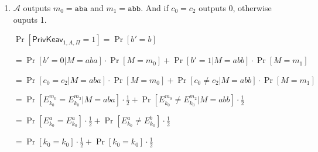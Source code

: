 \begin{enumerate}
    $= 1 \cdot \frac{1}{2} + 1 \cdot \frac{1}{2} = 1$
    
    $\Pr[\mathsf{PrivKeav}_{2,A,\Pi}=1] = \Pr[b' = b]$
    
    $= \Pr[E_{k_0}^{a}  = E_{k_1}^{a}] \cdot \frac{1}{2} + \Pr[E_{k_0}^{a} \ne E_{k_1}^{b}] \cdot \frac{1}{2}$
    
    $= \Pr[k_0  = k_1] \cdot \frac{1}{2} + \Pr[(k_1 + 1) \mod 26 \ne k_0 ] \cdot \frac{1}{2}$
    
    $= (26  \frac{1}{26} \frac{1}{26}) \cdot \frac{1}{2} + (1- \frac{1}{26}) \cdot \frac{1}{2} = \frac{1}{26}$
    
     $= \frac{1}{26} \cdot \frac{1}{2} + \frac{25}{26} \cdot \frac{1}{2} = \frac{1}{2}$
    
    $\Pr[\mathsf{PrivKeav}_{3,A,\Pi}=1] = \Pr[b' = b]$
    
    $= \Pr[E_{k_0}^{a}  = E_{k_1}^{a}] \cdot \frac{1}{2} + \Pr[E_{k_0}^{a} \ne E_{k_1}^{b}] \cdot \frac{1}{2}$
    
    $= \Pr[k_0  = k_1] \cdot \frac{1}{2} + \Pr[(k_1 + 1) \mod 26 \ne k_0 ] \cdot \frac{1}{2}$
    
    $= \frac{1}{26} \cdot \frac{1}{2} + \frac{25}{26} \cdot \frac{1}{2} = \frac{1}{2}$
    
    $\Pr[\mathsf{PrivKeav}_{A,\Pi}=1] = \frac{1}{3} \cdot \sum_{i=1}^{3} \Pr[\mathsf{PrivKeav}_{i,A,\Pi}=1]$
    
    $=  \frac{1}{3} \cdot (1 +  \frac{1}{2} +  \frac{1}{2})$
    
    $= \frac{2}{3} \approx 0.667$
	
	\item[(b)] $\mathcal{A}$ outputs $m_0=\texttt{aba}$ and $m_1=\texttt{abb}$. And if $c_0 = c_2$ outputs 0, otherwise ouputs 1.
	
	 $\Pr[\mathsf{PrivKeav}_{1,A,\Pi}=1] = \Pr[b' = b]$
	
	$= \Pr[b' = 0 | M = aba] \cdot \Pr[M = m_0] + \Pr[b' = 1 | M = abb] \cdot \Pr[M = m_1]$
	
	$= \Pr[c_0 = c_2 | M = aba] \cdot \Pr[M = m_0] + \Pr[c_0 \ne c_2 | M = abb] \cdot \Pr[M = m_1]$
	
	$= \Pr[E_{k_0}^{m_0}  = E_{k_0}^{m_2} | M = aba] \cdot \frac{1}{2} + \Pr[E_{k_0}^{m_0} \ne E_{k_0}^{m_2} | M = abb] \cdot \frac{1}{2}$
	
	$= \Pr[E_{k_0}^{a}  = E_{k_0}^{a}] \cdot \frac{1}{2} + \Pr[E_{k_0}^{a} \ne E_{k_0}^{b}] \cdot \frac{1}{2}$
	
	$= \Pr[k_0  = k_0] \cdot \frac{1}{2} + \Pr[k_0 = k_0] \cdot \frac{1}{2}$
	

\end{enumerate}
